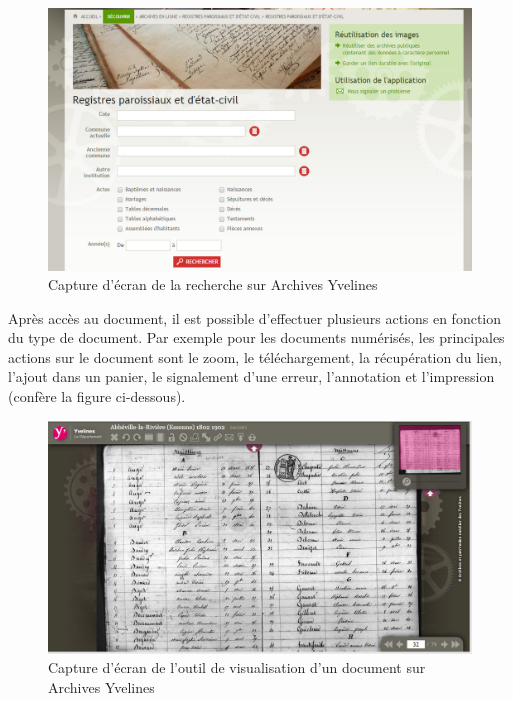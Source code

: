         \begin{figure}[ht!]
            \centering
            \includegraphics[width=1\textwidth]{figure/screen_yvelines_recherche.png}
            \caption{Capture d'écran de la recherche sur Archives Yvelines}
            \label{fig:yvelines_recherche}
        \end{figure}

        Après accès au document, il est possible d’effectuer plusieurs actions  en fonction du type de document. Par exemple
        pour les documents numérisés, les principales actions sur le document sont le zoom, le téléchargement, la récupération
        du lien, l’ajout dans un panier, le signalement d’une erreur, l’annotation et l’impression (confère la figure ci-dessous).

        \begin{figure}[ht!]
            \centering
            \includegraphics[width=1\textwidth]{figure/screen_yvelines_document.png}
            \caption{Capture d'écran de l'outil de visualisation d'un document sur Archives Yvelines}
            \label{fig:yvelines_doc}
        \end{figure}

